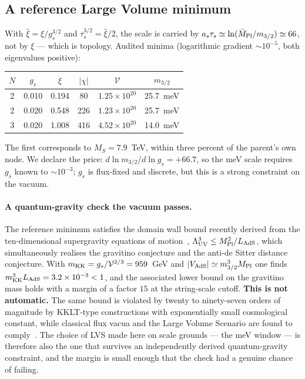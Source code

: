 \subsection{A reference Large Volume minimum}
With $\hat\xi=\xi/g_s^{3/2}$ and $\tau_s^{3/2}=\hat\xi/2$, the scale is carried by $a_s\tau_s\simeq\ln(\bar M_{\rm Pl}/m_{3/2})\simeq66$, not by $\xi$ --- which is topology. Audited minima (logarithmic gradient $\sim10^{-5}$, both eigenvalues positive):
\begin{center}\small
\begin{tabular}{cccccc}\toprule
$N$&$g_s$&$\xi$&$|\chi|$&$\mathcal V$&$m_{3/2}$\\\midrule
2&0.010&0.194&80&$1.25\times10^{20}$&25.7~meV\\
2&0.020&0.548&226&$1.23\times10^{20}$&25.7~meV\\
3&0.020&1.008&416&$4.52\times10^{20}$&14.0~meV\\\bottomrule
\end{tabular}
\end{center}
The first corresponds to $M_S=7.9$~TeV, within three percent of the parent's own node. We declare the price: $d\ln m_{3/2}/d\ln g_s=+66.7$, so the meV scale requires $g_s$ known to $\sim10^{-3}$; $g_s$ is flux-fixed and discrete, but this is a strong constraint on the vacuum.

\paragraph{A quantum-gravity check the vacuum passes.} The reference minimum satisfies the domain wall bound recently derived from the ten-dimensional supergravity equations of motion~\cite{CPV}, $\Lambda_{\rm UV}^{3}\leq M_{\rm Pl}^{2}/L_{\rm AdS}$, which simultaneously realises the gravitino conjecture and the anti-de Sitter distance conjecture. With $m_{\rm KK}=g_s/\mathcal V^{2/3}=959$~GeV and $|V_{\rm AdS}|\simeq m_{3/2}^{3}M_{\rm Pl}$ one finds $m_{\rm KK}^{3}L_{\rm AdS}=3.2\times10^{-3}<1$, and the associated lower bound on the gravitino mass holds with a margin of a factor $15$ at the string-scale cutoff. \textbf{This is not automatic.} The same bound is violated by twenty to ninety-seven orders of magnitude by KKLT-type constructions with exponentially small cosmological constant, while classical flux vacua and the Large Volume Scenario are found to comply~\cite{CPV}. The choice of LVS made here on scale grounds --- the meV window --- is therefore also the one that survives an independently derived quantum-gravity constraint, and the margin is small enough that the check had a genuine chance of failing.

